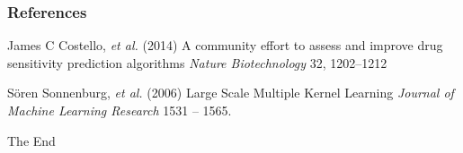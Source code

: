 \documentclass{beamer}
\begin{document}
\begin{frame}
\frametitle{References}
\footnotesize{
\begin{thebibliography}{99} %


 James C Costello, \textit{et al.} (2014)
\newblock A community effort to assess and improve drug sensitivity prediction algorithms
\newblock \emph{Nature Biotechnology} 32, 1202–1212 %

 S{\"o}ren Sonnenburg, \textit{et al.} (2006)
\newblock Large Scale Multiple Kernel Learning
\newblock \emph{Journal of Machine Learning Research} 1531 -- 1565.


\end{thebibliography}
}
\end{frame}


\begin{frame}
\Huge{\centerline{The End}}
\end{frame}

\end{document}
